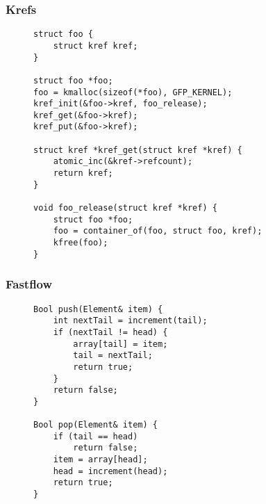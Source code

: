 \documentclass[aspectratio=169, pdf, 8pt, unicode]{beamer}
\begin{document}
\begin{frame}[fragile]
\frametitle{Krefs}
\begin{figure}[H]
\begin{minipage}{0.4\textwidth}
\begin{verbatim}
struct foo {
    struct kref kref;
}

struct foo *foo;
foo = kmalloc(sizeof(*foo), GFP_KERNEL);
kref_init(&foo->kref, foo_release);
kref_get(&foo->kref);
kref_put(&foo->kref);

struct kref *kref_get(struct kref *kref) {
    atomic_inc(&kref->refcount);
    return kref;
}

void foo_release(struct kref *kref) {
    struct foo *foo;
    foo = container_of(foo, struct foo, kref);
    kfree(foo);
}
\end{verbatim}
\end{minipage}
\end{figure}
\end{frame}

\begin{frame}[fragile]
\frametitle{Fastflow}
\begin{figure}[H]
\begin{minipage}{0.4\textwidth}
\begin{verbatim}
Bool push(Element& item) {
    int nextTail = increment(tail);
    if (nextTail != head) {
        array[tail] = item;
        tail = nextTail;
        return true;
    }
    return false;
}

Bool pop(Element& item) {
    if (tail == head)
        return false;
    item = array[head];
    head = increment(head);
    return true;
}
\end{verbatim}
\end{minipage}
\end{figure}
\end{frame}
\end{document}
